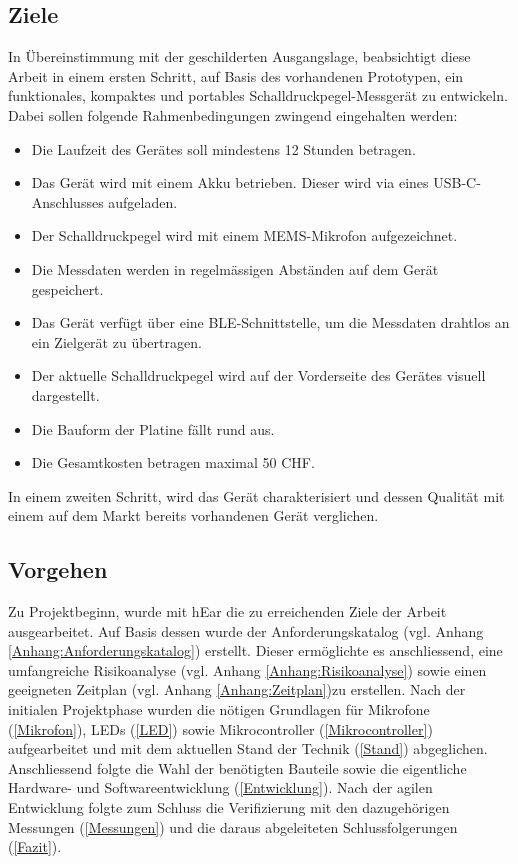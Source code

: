 \documentclass[12pt]{article}
\begin{document}
	\subsection{Ziele} \label{Ziele}
	In Übereinstimmung mit der geschilderten Ausgangslage, beabsichtigt diese Arbeit in einem ersten Schritt, auf Basis des vorhandenen Prototypen, ein funktionales, kompaktes und portables Schalldruckpegel-Messgerät zu entwickeln. Dabei sollen folgende Rahmenbedingungen zwingend eingehalten werden:
	\begin{itemize}
		\item Die Laufzeit des Gerätes soll mindestens 12 Stunden betragen.
		\item Das Gerät wird mit einem Akku betrieben. Dieser wird via eines USB-C-Anschlusses aufgeladen.
		\item Der Schalldruckpegel wird mit einem MEMS-Mikrofon aufgezeichnet.
		\item Die Messdaten werden in regelmässigen Abständen auf dem Gerät gespeichert.
		\item Das Gerät verfügt über eine BLE-Schnittstelle, um die Messdaten drahtlos an ein Zielgerät zu übertragen.
		\item Der aktuelle Schalldruckpegel wird auf der Vorderseite des Gerätes visuell dargestellt.
		\item Die Bauform der Platine fällt rund aus.
		\item Die Gesamtkosten betragen maximal 50 CHF.
	\end{itemize}
	In einem zweiten Schritt, wird das Gerät charakterisiert und dessen Qualität mit einem auf dem Markt bereits vorhandenen Gerät verglichen.
	\subsection{Vorgehen}
	Zu Projektbeginn, wurde mit hEar die zu erreichenden Ziele der Arbeit ausgearbeitet. Auf Basis dessen wurde der Anforderungskatalog (vgl. Anhang \ref{Anhang:Anforderungskatalog}) erstellt. Dieser ermöglichte es anschliessend, eine umfangreiche Risikoanalyse (vgl. Anhang \ref{Anhang:Risikoanalyse}) sowie einen geeigneten Zeitplan (vgl. Anhang \ref{Anhang:Zeitplan})zu erstellen. Nach der initialen Projektphase wurden die nötigen Grundlagen für Mikrofone (\ref{Mikrofon}), LEDs (\ref{LED}) sowie Mikrocontroller (\ref{Mikrocontroller}) aufgearbeitet und mit dem aktuellen Stand der Technik (\ref{Stand}) abgeglichen. Anschliessend folgte die Wahl der benötigten Bauteile sowie die eigentliche Hardware- und Softwareentwicklung (\ref{Entwicklung}). Nach der agilen Entwicklung folgte zum Schluss die Verifizierung mit den dazugehörigen Messungen (\ref{Messungen}) und die daraus abgeleiteten Schlussfolgerungen (\ref{Fazit}). \\
	
\end{document}
